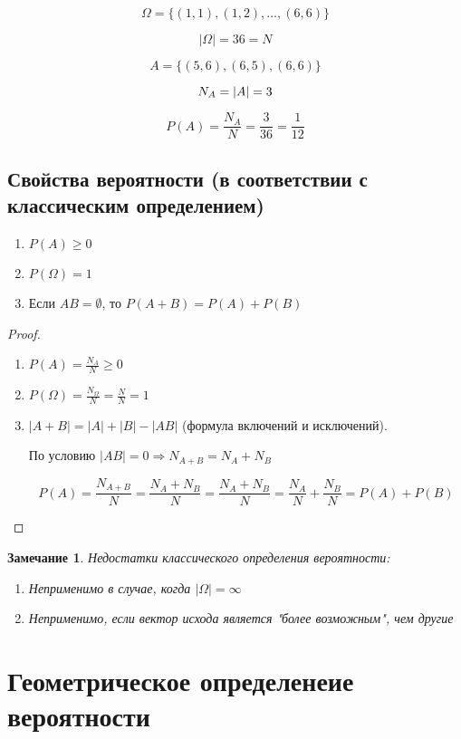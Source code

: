 \documentclass[a4paper, 14pt]{report}
\newtheorem{note}{Замечание}[chapter]
\begin{document}
$$
\Omega = \{ (1,1), (1,2), \dots, (6,6) \}
$$

$$
|\Omega| = 36 = N
$$

$$
A = \{ (5,6), (6,5), (6,6) \}
$$

$$
N_A = |A| = 3 \\
$$

$$
P(A) = \frac{N_A}{N} = \frac{3}{36} = \frac{1}{12}
$$

\subsection{Свойства вероятности (в соответствии с классическим определением)}

\begin{enumerate}
    \item $P(A) \geq 0$
    \item $P(\Omega) = 1$
    \item Если $AB = \emptyset$, то $P(A+B) = P(A) + P(B)$
\end{enumerate}

\begin{proof}
    \begin{enumerate}
        \item $P(A) = \frac{N_A}{N} \geq 0$
        \item $P(\Omega) = \frac{N_\Omega}{N} = \frac{N}{N} = 1$
        \item $|A+B|=|A|+|B|-|AB|$ (формула включений и исключений). 
            
            По условию $|AB|=0 \Rightarrow N_{A+B} = N_A + N_B$

            $$
            P(A) = \frac{N_{A+B}}{N} = \frac{N_A + N_B}{N} = \frac{N_A+N_B}{N}=\frac{N_A}{N} + \frac{N_B}{N} = P(A) + P(B)
            $$
    \end{enumerate}
\end{proof}

\begin{note}
    Недостатки классического определения вероятности:

    \begin{enumerate}
        \item Неприменимо в случае, когда $|\Omega| = \infty$
        \item Неприменимо, если вектор исхода является "более возможным", чем другие
    \end{enumerate}
\end{note}

\section{Геометрическое определенеие вероятности}
\end{document}
